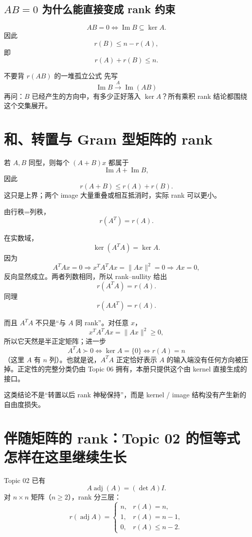 \documentclass[11pt,a4paper]{ctexart}
\begin{document}
\subsection{$AB=0$ 为什么能直接变成 rank 约束}
\[
AB=0
\iff
\operatorname{Im}B\subseteq\ker A.
\]
因此
\[
r(B)\le n-r(A),
\]
即
\[
\boxed{r(A)+r(B)\le n.}
\]

\begin{corebox}{不要背 $r(AB)$ 的一堆孤立公式}
先写
\[
\boxed{\operatorname{Im}B\xrightarrow{A}\operatorname{Im}(AB)}
\]
再问：$B$ 已经产生的方向中，有多少正好落入 $\ker A$？所有乘积 rank 结论都围绕这个交集展开。
\end{corebox}

\section{和、转置与 Gram 型矩阵的 rank}

若 $A,B$ 同型，则每个 $(A+B)x$ 都属于
\[
\operatorname{Im}A+\operatorname{Im}B,
\]
因此
\[
\boxed{r(A+B)\le r(A)+r(B).}
\]
这只是上界；两个 image 大量重叠或相互抵消时，实际 rank 可以更小。

由行秩=列秩，
\[
\boxed{r(A^T)=r(A).}
\]

在实数域，
\[
\ker(A^TA)=\ker A.
\]
因为
\[
A^TAx=0
\Longrightarrow
x^TA^TAx=\lVert Ax\rVert^2=0
\Longrightarrow Ax=0,
\]
反向显然成立。两者列数相同，所以 rank--nullity 给出
\[
\boxed{r(A^TA)=r(A).}
\]
同理
\[
\boxed{r(AA^T)=r(A).}
\]

而且 $A^TA$ 不只是“与 $A$ 同 rank”。对任意 $x$，
\[
x^TA^TAx=\lVert Ax\rVert^2\ge0,
\]
所以它天然是半正定矩阵；进一步
\[
\boxed{
A^TA\succ0
\iff
\ker A=\{0\}
\iff
r(A)=n
}
\]
（这里 $A$ 有 $n$ 列）。也就是说，$A^TA$ 正定恰好表示 $A$ 的输入端没有任何方向被压掉。正定性的完整分类仍由 Topic 06 拥有，本册只提供这个由 kernel 直接生成的接口。

这类结论不是“转置以后 rank 神秘保持”，而是 kernel / image 结构没有产生新的自由度损失。

\section{伴随矩阵的 rank：Topic 02 的恒等式怎样在这里继续生长}

Topic 02 已有
\[
A\operatorname{adj}(A)=(\det A)I.
\]
对 $n\times n$ 矩阵（$n\ge2$），rank 分三层：
\[
\boxed{
r(\operatorname{adj}A)=
\begin{cases}
 n,&r(A)=n,\\
 1,&r(A)=n-1,\\
 0,&r(A)\le n-2.
\end{cases}}
\]
\end{document}
